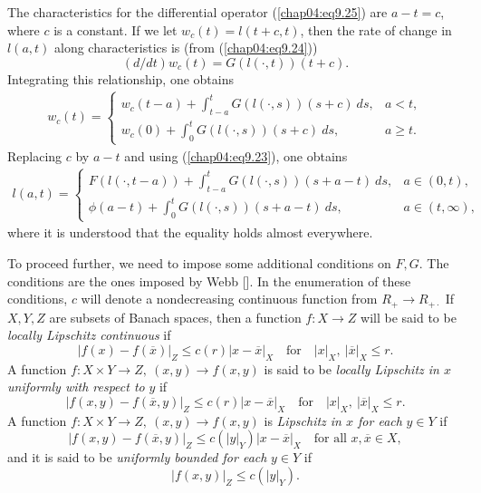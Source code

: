 \documentclass{surv-l}
\theoremstyle{plain}
\theoremstyle{definition}
\numberwithin{equation}{section}
\numberwithin{figure}{chapter}
\begin{document}
The characteristics for the differential operator (\ref{chap04:eq9.25}) are $a-t=c$, where $c$ is a constant. If we let $w_{c}(t)=l(t+c, t)$, then the rate of change in $l(a, t)$ along characteristics is (from (\ref{chap04:eq9.24}))
\begin{equation*}
(d/dt)w_{c}(t)=G(l(\cdot, t))(t+c).
\end{equation*}
Integrating this relationship, one obtains
\begin{align*}
w_{c}(t)=\left\{\begin{array}{ll}
w_{c}(t-a)+\int_{t-a}^{t}G(l(\cdot, s))(s+c)\ ds, & a<t,\\
w_{c}(0)+\int_{0}^{t}G(l(\cdot, s))(s+c)\ ds, & a\geq t.
\end{array}\right.
\end{align*}
Replacing $c$ by $a-t$ and using (\ref{chap04:eq9.23}), one obtains
\begin{align}\label{chap04:eq9.28}
l(a, t)=\left\{\begin{array}{ll}
F(l(\cdot, t-a))+\int_{t-a}^{t}G(l(\cdot, s))(s+a-t)\ ds, & a\in(0, t),\\
\phi(a-t)+\int_{0}^{t}G(l(\cdot, s))(s+a-t)\ ds, & a\in(t, \infty),
\end{array}\right.
\end{align}
where it is understood that the equality holds almost everywhere.

To proceed further, we need to impose some additional conditions on $F, G$. The conditions are the ones imposed by Webb [\citeyear{1985w}]. In the enumeration of these conditions, $c$ will denote a nondecreasing continuous function from $R_{+}\rightarrow R_{+\cdot}$ If $X, Y, Z$ are subsets of Banach spaces, then a function $f: X\rightarrow Z$ will be said to be \emph{locally Lipschitz continuous} if
\begin{equation*}
|f(x)-f(\overline{x})|_{Z}\leq c(r)|x-\overline{x}|_{X}\quad \text{for}\quad |x|_X,\ |\overline{x}|_X \leq r.
\end{equation*}
A function $f: X\times Y\rightarrow Z,\ (x, y)\rightarrow f(x, y)$ is said to be \emph{locally Lipschitz in $x$ uniformly with respect to} $y$ if
\begin{equation*}
|f(x, y)-f(\overline{x}, y)|_{Z}\leq c(r)|x-\overline{x}|_X\quad \text{for}\quad |x|_X,\ |\overline{x}|_{X}\leq r.
\end{equation*}
A function $f: X\times Y\rightarrow Z,\ (x, y)\rightarrow f(x, y)$ is \emph{Lipschitz in $x$ for each} $y\in Y$ if
\begin{equation*}
|f(x, y)-f(\overline{x}, y)|_{Z}\leq c(|y|_{Y})|x-\overline{x}|_{X}\quad \text{for all } x,\overline{x}\in X,
\end{equation*}
and it is said to be \emph{uniformly bounded for each} $y\in Y$ if
\begin{equation*}
|f(x, y)|_{Z}\leq c(|y|_{Y}).
\end{equation*}
\end{document}
